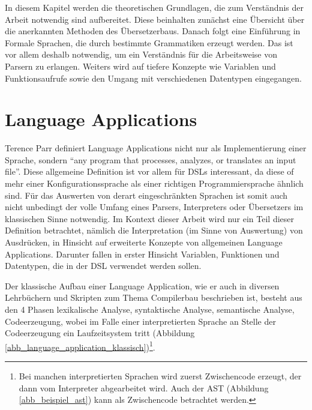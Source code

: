 \label{chapter_theoretische_grundlagen}

In diesem Kapitel werden die theoretischen Grundlagen, die zum Verständnis der Arbeit not\-wen\-dig sind aufbereitet. Diese beinhalten zunächst eine Über\-sicht über die anerkannten Methoden des Übersetzerbaus. Danach folgt eine Ein\-füh\-rung in Formale Sprachen, die durch bestimmte Grammatiken erzeugt werden. Das ist vor allem deshalb not\-wen\-dig, um ein Verständnis für die Arbeitsweise von Parsern zu erlangen. Weiters wird auf tiefere Konzepte wie Variablen und Funktionsaufrufe sowie den Umgang mit verschiedenen Datentypen eingegangen.


\section{Language Applications}
\label{theorie_language_applications}

Terence Parr definiert Language Applications nicht nur als Implementierung einer Sprache, sondern ``any program that processes, analyzes, or translates an input file''\cite{Parr10}. Diese allgemeine Definition ist vor allem für DSLs interessant, da diese of mehr  einer Konfigurationssprache als einer richtigen Programmiersprache ähnlich sind. Für das Auswerten von derart ein\-ge\-schränk\-ten Sprachen ist somit auch nicht unbedingt der volle Umfang eines Parsers, Interpreters oder Übersetzers im klassischen Sinne not\-wen\-dig. Im Kontext dieser Arbeit wird nur ein Teil dieser Definition betrachtet, nämlich die Interpretation (im Sinne von Auswertung) von Ausdrücken, in Hinsicht auf erweiterte Konzepte von allgemeinen Language Applications. Darunter fallen in erster Hinsicht Variablen, Funktionen und Datentypen, die in der DSL verwendet werden sollen.

Der klassische Aufbau einer Language Application, wie er auch in diversen Lehrbüchern und Skripten zum Thema Compilerbau beschrieben ist, besteht aus den 4 Phasen lexikalische Analyse, syntaktische Analyse, semantische Analyse, Codeerzeugung, wobei im Falle einer interpretierten Sprache an Stelle der Codeerzeugung ein Laufzeitsystem tritt (Abbildung \ref{abb_language_application_klassisch})\footnote{Bei manchen interpretierten Sprachen wird zuerst Zwischencode erzeugt, der dann vom Interpreter abgearbeitet wird. Auch der AST (Abbildung \ref{abb_beispiel_ast}) kann als Zwischencode betrachtet werden.}.


